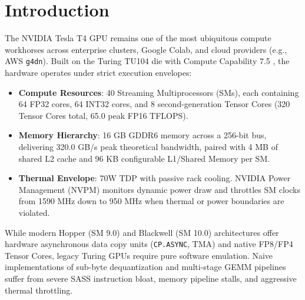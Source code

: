 \documentclass[10pt,twocolumn,letterpaper]{article}
\begin{document}
\section{Introduction}
The NVIDIA Tesla T4 GPU remains one of the most ubiquitous compute workhorses across enterprise clusters, Google Colab, and cloud providers (e.g., AWS \texttt{g4dn}). Built on the Turing TU104 die with Compute Capability 7.5 \cite{nvidia_turing_arch}, the hardware operates under strict execution envelopes:
\begin{itemize}
  \item \textbf{Compute Resources}: 40 Streaming Multiprocessors (SMs), each containing 64 FP32 cores, 64 INT32 cores, and 8 second-generation Tensor Cores (320 Tensor Cores total, 65.0 peak FP16 TFLOPS).
  \item \textbf{Memory Hierarchy}: 16 GB GDDR6 memory across a 256-bit bus, delivering 320.0 GB/s peak theoretical bandwidth, paired with 4 MB of shared L2 cache and 96 KB configurable L1/Shared Memory per SM.
  \item \textbf{Thermal Envelope}: 70W TDP with passive rack cooling. NVIDIA Power Management (NVPM) monitors dynamic power draw and throttles SM clocks from 1590 MHz down to 950 MHz when thermal or power boundaries are violated.
\end{itemize}

While modern Hopper (SM 9.0) and Blackwell (SM 10.0) architectures offer hardware asynchronous data copy units (\texttt{CP.ASYNC}, TMA) and native FP8/FP4 Tensor Cores, legacy Turing GPUs require pure software emulation. Naive implementations of sub-byte dequantization and multi-stage GEMM pipelines suffer from severe SASS instruction bloat, memory pipeline stalls, and aggressive thermal throttling.
\end{document}
